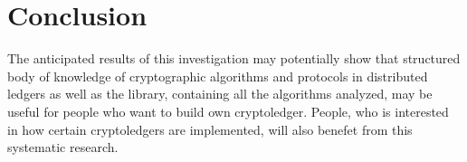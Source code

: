 \documentclass[12pt]{article}
\begin{document}
\section{Conclusion}
The anticipated results of this investigation may potentially show that
structured body of knowledge of cryptographic algorithms and protocols in
distributed ledgers as well as the library, containing all the algorithms
analyzed, may be useful for people who want to build own cryptoledger. People,
who is interested in how certain cryptoledgers are implemented, will also
benefet from this systematic research.
\end{document}
